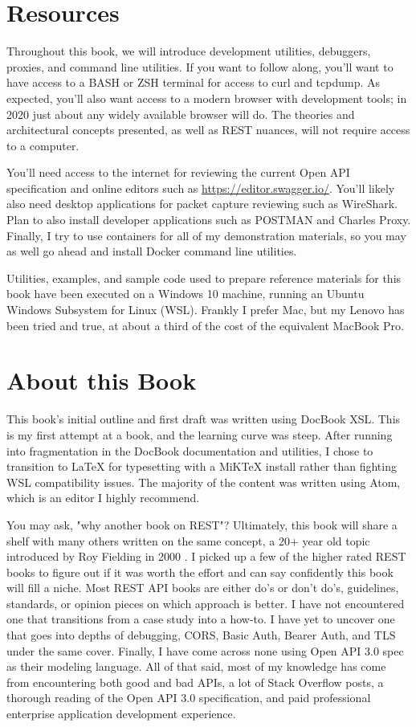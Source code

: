 \section*{Resources}

Throughout this book, we will introduce development utilities, debuggers, proxies, and command line utilities.  If you want to follow along, you'll want to have access to a BASH or ZSH terminal for access to curl and tcpdump.  As expected, you'll also want access to a modern browser with development tools; in 2020 just about any widely available browser will do.  The theories and architectural concepts presented, as well as REST nuances, will not require access to a computer.

You'll need access to the internet for reviewing the current Open API specification and online editors such as \url{https://editor.swagger.io/}.  You'll likely also need desktop applications for packet capture reviewing such as WireShark.  Plan to also install developer applications such as POSTMAN and Charles Proxy.  Finally, I try to use containers for all of my demonstration materials, so you may as well go ahead and install Docker command line utilities.

Utilities, examples, and sample code used to prepare reference materials for this book have been executed on a Windows 10 machine, running an Ubuntu Windows Subsystem for Linux (WSL).  Frankly I prefer Mac, but my Lenovo has been tried and true, at about a third of the cost of the equivalent MacBook Pro.

\section*{About this Book}
This book's initial outline and first draft was written using DocBook XSL.  This is my first attempt at a book, and the learning curve was steep.  After running into fragmentation in the DocBook documentation and utilities, I chose to transition to LaTeX for typesetting with a MiKTeX install rather than fighting WSL compatibility issues.  The majority of the content was written using Atom, which is an editor I highly recommend.

You may ask, "why another book on REST"?  Ultimately, this book will share a shelf with many others written on the same concept, a 20+ year old topic introduced by Roy Fielding in 2000 \cite{fielding}.  I picked up a few of the higher rated REST books to figure out if it was worth the effort and can say confidently this book will fill a niche. Most REST API books are either do's or don't do's, guidelines, standards, or opinion pieces on which approach is better.  I have not encountered one that transitions from a case study into a how-to.  I have yet to uncover one that goes into depths of debugging, CORS, Basic Auth, Bearer Auth, and TLS under the same cover.  Finally, I have come across none using Open API 3.0 spec as their modeling language.  All of that said, most of my knowledge has come from encountering both good and bad APIs, a lot of Stack Overflow posts, a thorough reading of the Open API 3.0 specification, and paid professional enterprise application development experience.

